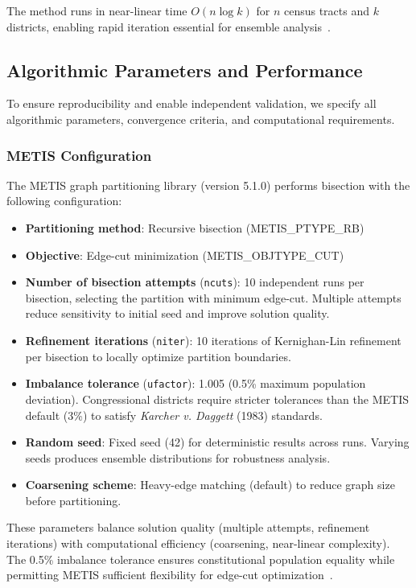 The method runs in near-linear time $O(n \log k)$ for $n$ census tracts and $k$ districts, enabling rapid iteration essential for ensemble analysis~\cite{deluca2026recursive}.

\subsection{Algorithmic Parameters and Performance}

To ensure reproducibility and enable independent validation, we specify all algorithmic parameters, convergence criteria, and computational requirements.

\subsubsection{METIS Configuration}

The METIS graph partitioning library (version 5.1.0) performs bisection with the following configuration:

\begin{itemize}
\item \textbf{Partitioning method}: Recursive bisection (METIS\_PTYPE\_RB)
\item \textbf{Objective}: Edge-cut minimization (METIS\_OBJTYPE\_CUT)
\item \textbf{Number of bisection attempts} (\texttt{ncuts}): 10 independent runs per bisection, selecting the partition with minimum edge-cut. Multiple attempts reduce sensitivity to initial seed and improve solution quality.
\item \textbf{Refinement iterations} (\texttt{niter}): 10 iterations of Kernighan-Lin refinement per bisection to locally optimize partition boundaries.
\item \textbf{Imbalance tolerance} (\texttt{ufactor}): 1.005 (0.5\% maximum population deviation). Congressional districts require stricter tolerances than the METIS default (3\%) to satisfy \emph{Karcher v. Daggett} (1983) standards.
\item \textbf{Random seed}: Fixed seed (42) for deterministic results across runs. Varying seeds produces ensemble distributions for robustness analysis.
\item \textbf{Coarsening scheme}: Heavy-edge matching (default) to reduce graph size before partitioning.
\end{itemize}

These parameters balance solution quality (multiple attempts, refinement iterations) with computational efficiency (coarsening, near-linear complexity). The 0.5\% imbalance tolerance ensures constitutional population equality while permitting METIS sufficient flexibility for edge-cut optimization~\cite{deluca2026recursive}.

